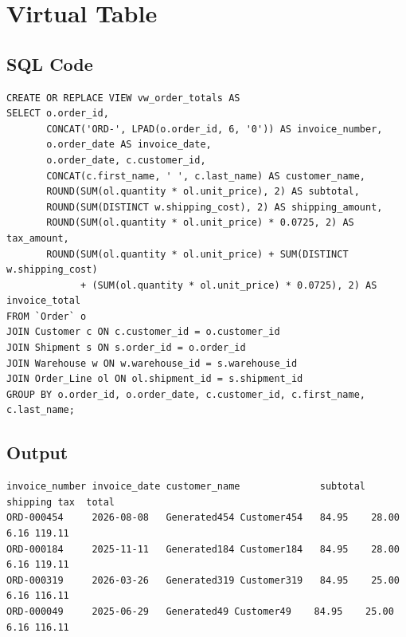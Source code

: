 \section{Virtual Table}

\subsection{SQL Code}
{\scriptsize
\begin{verbatim}
CREATE OR REPLACE VIEW vw_order_totals AS
SELECT o.order_id,
       CONCAT('ORD-', LPAD(o.order_id, 6, '0')) AS invoice_number,
       o.order_date AS invoice_date,
       o.order_date, c.customer_id,
       CONCAT(c.first_name, ' ', c.last_name) AS customer_name,
       ROUND(SUM(ol.quantity * ol.unit_price), 2) AS subtotal,
       ROUND(SUM(DISTINCT w.shipping_cost), 2) AS shipping_amount,
       ROUND(SUM(ol.quantity * ol.unit_price) * 0.0725, 2) AS tax_amount,
       ROUND(SUM(ol.quantity * ol.unit_price) + SUM(DISTINCT w.shipping_cost)
             + (SUM(ol.quantity * ol.unit_price) * 0.0725), 2) AS invoice_total
FROM `Order` o
JOIN Customer c ON c.customer_id = o.customer_id
JOIN Shipment s ON s.order_id = o.order_id
JOIN Warehouse w ON w.warehouse_id = s.warehouse_id
JOIN Order_Line ol ON ol.shipment_id = s.shipment_id
GROUP BY o.order_id, o.order_date, c.customer_id, c.first_name, c.last_name;
\end{verbatim}
}

\subsection{Output}
{\scriptsize
\begin{verbatim}
invoice_number invoice_date customer_name              subtotal shipping tax  total
ORD-000454     2026-08-08   Generated454 Customer454   84.95    28.00    6.16 119.11
ORD-000184     2025-11-11   Generated184 Customer184   84.95    28.00    6.16 119.11
ORD-000319     2026-03-26   Generated319 Customer319   84.95    25.00    6.16 116.11
ORD-000049     2025-06-29   Generated49 Customer49    84.95    25.00    6.16 116.11
\end{verbatim}
}
